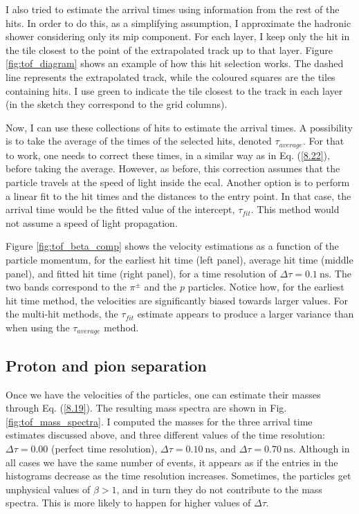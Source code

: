 I also tried to estimate the arrival times using information from the rest of the hits. In order to do this, as a simplifying assumption, I approximate the hadronic shower considering only its \gls{mip} component. For each layer, I keep only the hit in the tile closest to the point of the extrapolated track up to that layer. Figure \ref{fig:tof_diagram} shows an example of how this hit selection works. The dashed line represents the extrapolated track, while the coloured squares are the tiles containing hits. I use green to indicate the tile closest to the track in each layer (in the sketch they correspond to the grid columns).

Now, I can use these collections of hits to estimate the arrival times. A possibility is to take the average of the times of the selected hits, denoted $\tau_{average}$. For that to work, one needs to correct these times, in a similar way as in Eq. (\ref{8.22}), before taking the average. However, as before, this correction assumes that the particle travels at the speed of light inside the \gls{ecal}. Another option is to perform a linear fit to the hit times and the distances to the entry point. In that case, the arrival time would be the fitted value of the intercept, $\tau_{fit}$. This method would not assume a speed of light propagation.

Figure \ref{fig:tof_beta_comp} shows the velocity estimations as a function of the particle momentum, for the earliest hit time (left panel), average hit time (middle panel), and fitted hit time (right panel), for a time resolution of $\Delta \tau = 0.1 ~ \mathrm{ns}$. The two bands correspond to the $\pi^{\pm}$ and the $p$ particles. Notice how, for the earliest hit time method, the velocities are significantly biased towards larger values. For the multi-hit methods, the $\tau_{fit}$ estimate appears to produce a larger variance than when using the $\tau_{average}$ method.

\subsection{Proton and pion separation}

Once we have the velocities of the particles, one can estimate their masses through Eq. (\ref{8.19}). The resulting mass spectra are shown in Fig. \ref{fig:tof_mass_spectra}. I computed the masses for the three arrival time estimates discussed above, and three different values of the time resolution: $\Delta \tau = 0.00$ (perfect time resolution), $\Delta \tau = 0.10 ~ \mathrm{ns}$, and $\Delta \tau = 0.70 ~ \mathrm{ns}$. Although in all cases we have the same number of events, it appears as if the entries in the histograms decrease as the time resolution increases. Sometimes, the particles get unphysical values of $\beta > 1$, and in turn they do not contribute to the mass spectra. This is more likely to happen for higher values of $\Delta \tau$.

